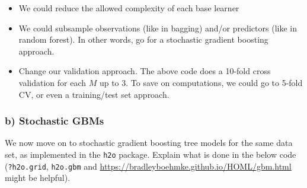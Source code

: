 \documentclass[
]{article}
\providecommand{\tightlist}{%
  \setlength{\itemsep}{0pt}\setlength{\parskip}{0pt}}
\begin{document}
\begin{itemize}
\tightlist
\item
  We could reduce the allowed complexity of each base learner
\item
  We could subsample observations (like in bagging) and/or predictors
  (like in random forest). In other words, go for a stochastic gradient
  boosting approach.
\item
  Change our validation approach. The above code does a 10-fold cross
  validation for each \(M\) up to \(3\). To save on computations, we
  could go to 5-fold CV, or even a training/test set approach.
\end{itemize}

\hypertarget{b-stochastic-gbms}{%
\subsubsection{b) Stochastic GBMs}\label{b-stochastic-gbms}}

We now move on to stochastic gradient boosting tree models for the same
data set, as implemented in the \texttt{h2o} package. Explain what is
done in the below code (\texttt{?h2o.grid}, \texttt{h2o.gbm} and
\url{https://bradleyboehmke.github.io/HOML/gbm.html} might be helpful).
\end{document}
